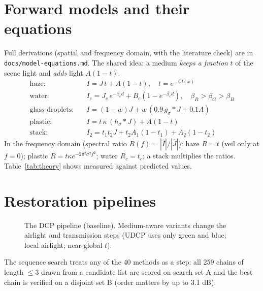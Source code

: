 \documentclass[10pt,a4paper]{article}
\newcommand{\tablein}[1]{}
\begin{document}
\section{Forward models and their equations}
Full derivations (spatial and frequency domain, with the literature check) are in \texttt{docs/model-equations.md}. The shared idea: a medium \emph{keeps a fraction} $t$ of the scene light and \emph{adds} light $A(1-t)$.
\begin{align}
\text{haze:}\quad & I = J\,t + A(1-t),\quad t = e^{-\beta d(x)}\\
\text{water:}\quad & I_c = J_c\,e^{-\beta_c d} + B_c(1-e^{-\beta_c d}),\quad \beta_R>\beta_G>\beta_B\\
\text{glass droplets:}\quad & I = (1-w)J + w\,(0.9\,g_\sigma{*}J + 0.1A)\\
\text{plastic:}\quad & I = t\,\kappa\,(h_\sigma{*}J)+A(1-t)\\
\text{stack:}\quad & I_2 = t_1t_2J + t_2A_1(1-t_1) + A_2(1-t_2)
\end{align}
In the frequency domain (spectral ratio $R(f)=|\hat I|/|\hat J|$): haze $R=t$ (veil only at $f=0$); plastic $R=t\kappa e^{-2\pi^2\sigma^2f^2}$; water $R_c=t_c$; a stack multiplies the ratios. Table~\ref{tab:theory} shows measured against predicted values.
\begin{table}[H]\centering\tiny\tablein{theory_checks}\caption{Frequency-domain theory against measurement on our synthetic pictures and real data (rms error of the predicted curve; mid-band ratio measured and predicted).}\label{tab:theory}\end{table}

\section{Restoration pipelines}
\begin{figure}[H]\centering
{}
\caption{The DCP pipeline (baseline). Medium-aware variants change the airlight and transmission steps (UDCP uses only green and blue; local airlight; near-global $t$).}\end{figure}
The sequence search treats any of the 40 methods as a step: all 259 chains of length $\le3$ drawn from a candidate list are scored on search set A and the best chain is verified on a disjoint set B (order matters by up to 3.1 dB).
\end{document}
